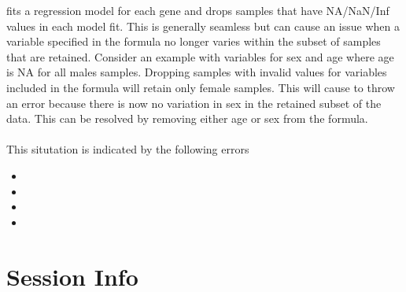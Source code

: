 \documentclass[12pt]{article}\usepackage[]{graphicx}\usepackage[]{xcolor}
\begin{document}
 fits a regression model for each gene and drops samples that have NA/NaN/Inf values in each model fit.  This is generally seamless but can cause an issue when a variable specified in the formula no longer varies within the subset of samples that are retained.  Consider an example with variables for sex and age where age is NA for all males samples.  Dropping samples with invalid values for variables included in the formula will retain only female samples.  This will cause  to throw an error because there is now no variation in sex in the retained subset of the data.  This can be resolved by removing either age or sex from the formula.\\
\\
This situtation is indicated by the following errors   
\begin{itemize}
  \item {}
  \item {}
  \item {}
  \item {}
\end{itemize}











\section*{Session Info}
\end{document}
